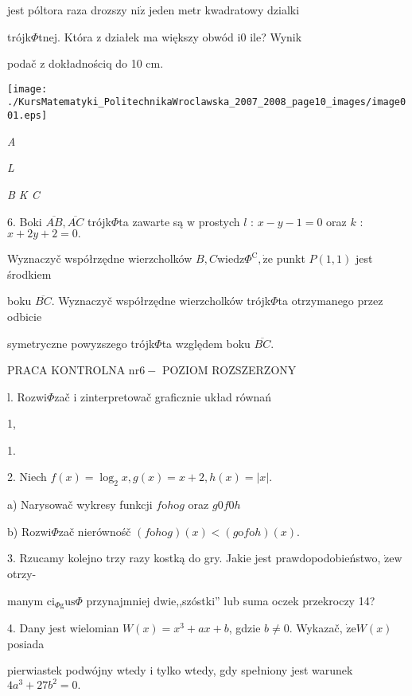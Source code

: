 \documentclass[a4paper,12pt]{article}
\begin{document}
jest póltora raza drozszy $\mathrm{n}\mathrm{i}\dot{\mathrm{z}}$ jeden metr kwadratowy dzialki

trójk$\Phi$tnej. Która $\mathrm{z}$ działek ma większy obwód $\mathrm{i}0$ ile? Wynik

podač $\mathrm{z}$ dokładnościq do 10 cm.
\begin{center}
\texttt{[image: ./KursMatematyki\_PolitechnikaWroclawska\_2007\_2008\_page10\_images/image001.eps]}
\end{center}
{\it A}

{\it L}

{\it B  K C}

6. Boki $\overline{AB}, \overline{AC}$ trójk$\Phi$ta zawarte są $\mathrm{w}$ prostych $l$ : $x-y-1=0$ oraz $k$ : $x+2y+2=0.$

Wyznaczyč współrzędne wierzcholków $B, C \mathrm{w}\mathrm{i}\mathrm{e}\mathrm{d}\mathrm{z}\Phi^{\mathrm{C}}, \dot{\mathrm{z}}\mathrm{e}$ punkt $P(1,1)$ jest środkiem

boku $\overline{BC}$. Wyznaczyč współrzędne wierzcholków trójk$\Phi$ta otrzymanego przez odbicie

symetryczne powyzszego trójk$\Phi$ta względem boku $\overline{BC}.$





PRACA KONTROLNA $\mathrm{n}\mathrm{r} 6-$ POZIOM ROZSZERZONY

l. Rozwi$\Phi$zač $\mathrm{i}$ zinterpretowač graficznie układ równań 

1,

1.

2. Niech $f(x)=\log_{2}x, g(x)=x+2, h(x)=|x|.$

a) Narysowač wykresy funkcji $f\mathrm{o}h\mathrm{o}g$ oraz $g0f0h$

b) Rozwi$\Phi$zač nierównośč $(f\mathrm{o}h\mathrm{o}g)(x)<(g\mathrm{o}f\mathrm{o}h)(x).$

3. Rzucamy kolejno trzy razy kostką do gry. Jakie jest prawdopodobieństwo, $\dot{\mathrm{z}}\mathrm{e}\mathrm{w}$ otrzy-

manym $\mathrm{c}\mathrm{i}_{\Phi \mathrm{g}}\mathrm{u}\mathrm{s}\Phi$ przynajmniej dwie,,szóstki'' lub suma oczek przekroczy 14?

4. Dany jest wielomian $W(x) = x^{3}+ax+b$, gdzie $b \neq 0$. Wykazač, $\dot{\mathrm{z}}\mathrm{e} W(x)$ posiada

pierwiastek podwójny wtedy $\mathrm{i}$ tylko wtedy, gdy spełniony jest warunek $4a^{3}+27b^{2}=0.$
\end{document}
